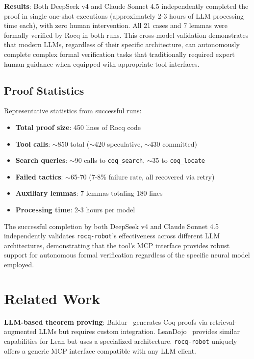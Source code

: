 \documentclass[11pt,a4paper]{article}
\newcommand{\tool}{\texttt{rocq-robot}\xspace}
\begin{document}
\textbf{Results}: Both DeepSeek v4 and Claude Sonnet 4.5 independently completed the proof in single one-shot executions (approximately 2-3 hours of LLM processing time each), with zero human intervention. All 21 cases and 7 lemmas were formally verified by Rocq in both runs. This cross-model validation demonstrates that modern LLMs, regardless of their specific architecture, can autonomously complete complex formal verification tasks that traditionally required expert human guidance when equipped with appropriate tool interfaces.

\subsection{Proof Statistics}

Representative statistics from successful runs:

\begin{itemize}
\item \textbf{Total proof size}: 450 lines of Rocq code
\item \textbf{Tool calls}: $\sim$850 total ($\sim$420 speculative, $\sim$430 committed)
\item \textbf{Search queries}: $\sim$90 calls to \texttt{coq\_search}, $\sim$35 to \texttt{coq\_locate}
\item \textbf{Failed tactics}: $\sim$65-70 (7-8\% failure rate, all recovered via retry)
\item \textbf{Auxiliary lemmas}: 7 lemmas totaling 180 lines
\item \textbf{Processing time}: 2-3 hours per model
\end{itemize}

The successful completion by both DeepSeek v4 and Claude Sonnet 4.5 independently validates \tool's effectiveness across different LLM architectures, demonstrating that the tool's MCP interface provides robust support for autonomous formal verification regardless of the specific neural model employed.

\section{Related Work}

\textbf{LLM-based theorem proving}: Baldur~\cite{first2023baldur} generates Coq proofs via retrieval-augmented LLMs but requires custom integration. LeanDojo~\cite{yang2023leandojo} provides similar capabilities for Lean but uses a specialized architecture. \tool uniquely offers a generic MCP interface compatible with any LLM client.
\end{document}
